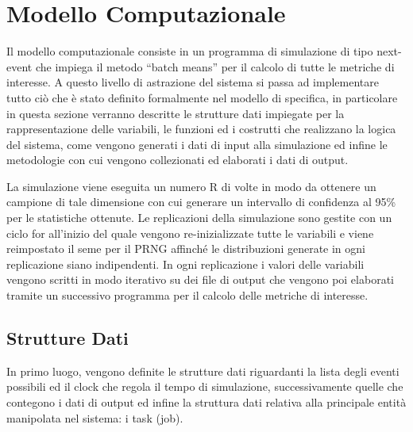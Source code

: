 \section{Modello Computazionale}
Il modello computazionale consiste in un programma di simulazione di tipo
next-event che impiega il metodo ``batch means'' per il calcolo di tutte le
metriche di interesse. 
A questo livello di astrazione del sistema si passa ad implementare tutto ciò
che è stato definito formalmente nel modello di specifica, in particolare in
questa sezione verranno descritte le strutture dati impiegate per la
rappresentazione delle variabili, le funzioni ed i costrutti che realizzano la
logica del sistema, come vengono generati i dati di input alla simulazione ed
infine le metodologie con cui vengono collezionati ed elaborati i dati di
output.

La simulazione viene eseguita un numero R di
volte in modo da ottenere un campione di tale dimensione con cui generare un
intervallo di confidenza al 95\% per le statistiche ottenute.  Le replicazioni
della simulazione sono gestite con un ciclo for all’inizio del quale vengono
re-inizializzate tutte le variabili e viene reimpostato il seme per il PRNG
affinché le distribuzioni generate in ogni replicazione siano indipendenti. In
ogni replicazione i valori delle variabili vengono scritti in modo iterativo su
dei file di output che vengono poi elaborati tramite un successivo programma per
il calcolo delle metriche di interesse.
%
%
\subsection{Strutture Dati}
In primo luogo, vengono definite le strutture dati riguardanti la lista degli
eventi possibili ed il clock che regola il tempo di simulazione, successivamente
quelle che contegono i dati di output ed infine la struttura dati relativa alla
principale entità manipolata nel sistema: i task (job).
%
